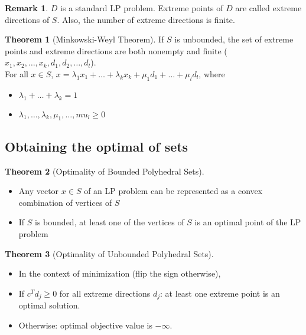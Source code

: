 \documentclass{article}
\theoremstyle{definition}
\newtheorem{theorem}{Theorem}[section]
\newtheorem*{remark}{Remark}
\begin{document}
	\begin{remark}
		$D$ is a standard LP problem. Extreme points of $D$ are called extreme directions of $S$. Also, the number of extreme directions is finite.
	\end{remark}
	
	\begin{theorem}[Minkowski-Weyl Theorem]\hfill\break
		If $S$ is unbounded, the set of extreme points and extreme directions are both nonempty and finite ($x_1, x_2, \dots, x_k, d_1, d_2, \dots, d_l$).\\ For all $x \in S$, $x = \lambda_1x_1 + \dots + \lambda_kx_k + \mu_1d_1+\dots+\mu_ld_l$, where
		\begin{itemize}
		    \item $\lambda_1+\dots+\lambda_k=1$
		    \item $\lambda_1, \dots, \lambda_k, \mu_1, \dots, mu_l \geq0$
		\end{itemize}
	\end{theorem}

    \subsection{Obtaining the optimal of sets}
    	\begin{theorem}[Optimality of Bounded Polyhedral Sets]\hfill
		\begin{itemize}
			\item Any vector $x \in S$ of an LP problem can be represented as a convex combination of vertices of $S$
			\item If $S$ is bounded, at least one of the vertices of $S$ is an optimal point of the LP problem
		\end{itemize}
	\end{theorem}

	\begin{theorem}[Optimality of Unbounded Polyhedral Sets]\hfill
	\label{ubpolysetop}
		\begin{itemize}
			\item In the context of minimization (flip the sign otherwise),
			\item If $c^Td_j \geq 0$ for all extreme directions $d_j$: at least one extreme point is an optimal solution.
			\item Otherwise: optimal objective value is $-\infty$.
		\end{itemize}
	\end{theorem}
\end{document}
